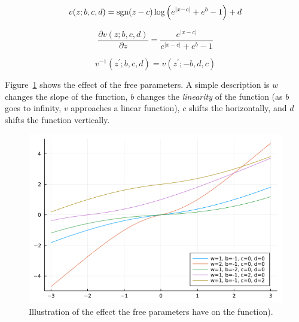 \documentclass[twoside]{article}
\begin{document}


\begin{equation}
  v(z; b, c, d) = \operatorname{sgn}(z - c) \log \left( e^{\lvert x - c \rvert}
   + e^{b} - 1 \right) + d \label{eq:luddeflow}
\end{equation}

\begin{equation}
  \frac{\partial v(z; b, c, d)}{\partial z} = \frac{e^{\lvert x - c \rvert}}
  {e^{\lvert x - c \rvert} + e^{b} - 1}
  \label{eq:luddeflow_grad}
\end{equation}

\begin{equation}
  v^{-1}(z^\prime; b, c, d) = v(z^\prime; -b, d, c) \label{eq:luddeflow_inv}
\end{equation}

Figure~\ref{fig:luddeflow} shows the effect of the free parameters. A simple
description is \(w\) changes the slope of the function, \(b\) changes the
\emph{linearity} of the function (as \(b\) goes to infinity, \(v\) approaches a
linear function), \(c\) shifts the horizontally, and \(d\) shifts the function
vertically.

\begin{figure}[ht]
  \vspace{.3in}
  \includegraphics[width=\columnwidth]{luddeflow.png}
  \vspace{.3in}
  \caption{Illustration of the effect the free parameters have on the function).
  }\label{fig:luddeflow}
\end{figure}
\end{document}
